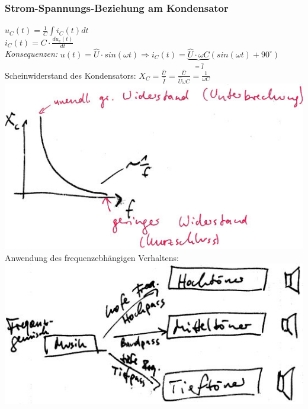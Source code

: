 \subsubsection{Strom-Spannungs-Beziehung am Kondensator}
$u_C(t)=\frac{1}{C}\int i_C(t) dt$\\
$i_C(t)=C\cdot \frac{du_c(t)}{dt}$\\
\emph{Konsequenzen:} $u(t)=\hat{U}\cdot sin (\omega t) \Rightarrow i_C(t)=\underbrace{\hat{U}\cdot \omega C}_{=\hat{I}}(sin (\omega t) + 90^{\circ})$\\
Scheinwiderstand des Kondensators: $X_C=\frac{\hat{U}}{\hat{I}}=\frac{\hat{U}}{\hat{U}\omega C}=\frac{1}{\omega C}$\\
\includegraphics[scale=.75]{Abbildungen/ABB408}\\
Anwendung des frequenzebhängigen Verhaltens:\\
\includegraphics[scale=.75]{Abbildungen/ABB409}





